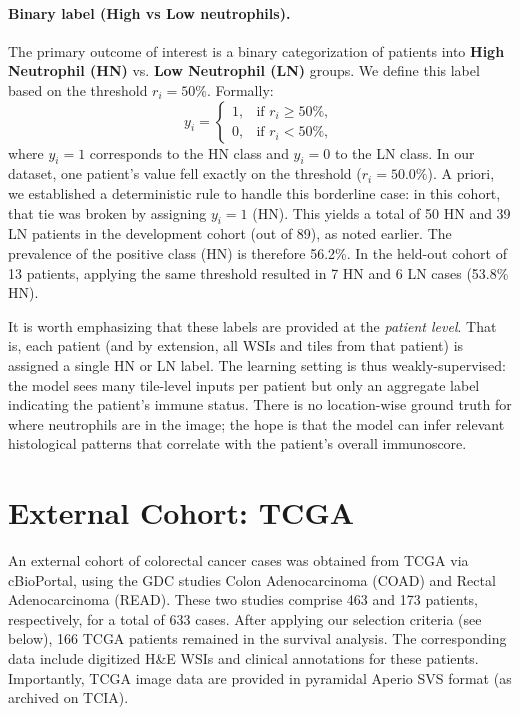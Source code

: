 \paragraph{Binary label (High vs Low neutrophils).}
The primary outcome of interest is a binary categorization of patients into \textbf{High Neutrophil (HN)} vs. \textbf{Low Neutrophil (LN)} groups. We define this label based on the threshold $r_i = 50\%$. Formally:
\begin{equation}\label{eq:hn_cutoff}
y_i = 
\begin{cases} 
1, & \text{if } r_i \ge 50\%, \\[6pt]
0, & \text{if } r_i < 50\%, 
\end{cases}
\end{equation}
where $y_i = 1$ corresponds to the HN class and $y_i = 0$ to the LN class. In our dataset, one patient’s value fell exactly on the threshold ($r_i = 50.0\%$). A priori, we established a deterministic rule to handle this borderline case: in this cohort, that tie was broken by assigning $y_i = 1$ (HN). This yields a total of 50 HN and 39 LN patients in the development cohort (out of 89), as noted earlier. The prevalence of the positive class (HN) is therefore 56.2\%. In the held-out cohort of 13 patients, applying the same threshold resulted in 7 HN and 6 LN cases (53.8\% HN).

It is worth emphasizing that these labels are provided at the \emph{patient level}. That is, each patient (and by extension, all WSIs and tiles from that patient) is assigned a single HN or LN label. The learning setting is thus weakly-supervised: the model sees many tile-level inputs per patient but only an aggregate label indicating the patient’s immune status. There is no location-wise ground truth for where neutrophils are in the image; the hope is that the model can infer relevant histological patterns that correlate with the patient’s overall immunoscore.

\section{External Cohort: TCGA}
An external cohort of colorectal cancer cases was obtained from TCGA via cBioPortal, using the GDC studies Colon Adenocarcinoma (COAD) and Rectal Adenocarcinoma (READ). These two studies comprise 463 and 173 patients, respectively, for a total of 633 cases. After applying our selection criteria (see below), 166 TCGA patients remained in the survival analysis. The corresponding data include digitized H\&E WSIs and clinical annotations for these patients. Importantly, TCGA image data are provided in pyramidal Aperio SVS format (as archived on TCIA).

